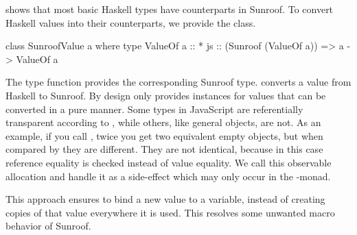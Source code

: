  shows that most basic 
Haskell types have counterparts in
Sunroof. To convert Haskell values into their 
counterparts, we provide the  class.
\begin{Code}
class SunroofValue a where
  type ValueOf a :: *
  js :: (Sunroof (ValueOf a)) => a -> ValueOf a
\end{Code}
The type function
 \cite{Chakravarty:05:AssociatedTypeSynonyms} 
provides the corresponding Sunroof type.
 converts a value from Haskell to Sunroof. 
By design  
only provides instances for values that can be converted in a pure
manner. Some types in JavaScript are referentially 
transparent according to \Src{==}, while others, like general objects,
are not. As an example, if you call , twice you get two 
equivalent empty objects, but when compared by \Src{==} they are different. They
are not identical, because in this case reference equality is checked
instead of value equality. We call this observable allocation and handle 
it as a side-effect which may only occur in the \JS-monad. 

This approach ensures to bind a new value to a variable,
instead of creating copies of that value everywhere
it is used. This resolves some unwanted macro behavior 
of Sunroof.

\begin{comment}
Sunroof also offers the ability to work with record like data structures.
For this purpose Sunroof offers the \Src{JSTuple} type class.
\begin{Code}
class Sunroof o => JSTuple o where
  type Internals o
  match :: (Sunroof o) => o -> Internals o
  tuple :: Internals o -> JS t o
\end{Code}
If you have a record of Sunroof data that you want to
encode as a JavaScript object you can provide this ability 
by implementing \Src{JSTuple}. The \Src{Internals} type function
delivers your record type. Encoding that record as a \Src{Sunroof}
value is done through \Src{tuple}. 
Because of the observable allocation issue, we have to be 
inside the \JS-monad to do this.
Decomposing the encoding is done with \Src{match}. Because the
\Src{JSTuple} idiom is meant to represent immutable data structures, this 
can be done in a pure manner although there are ways to mutate 
values referenced by the decomposed record, since they are only 
references to the actual data in JavaScript.
\end{comment}

